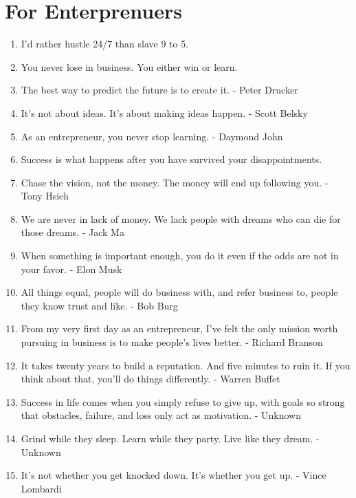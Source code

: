     \section*{For Enterprenuers}
        \begin{enumerate}
            \item I’d rather hustle 24/7 than slave 9 to 5.

            \item You never lose in business. You either win or learn.

            \item The best way to predict the future is to create it. - Peter Drucker

            \item It’s not about ideas. It’s about making ideas happen.  - Scott Belsky

            \item As an entrepreneur, you never stop learning.  - Daymond John

            \item Success is what happens after you have survived your disappointments.

            \item Chase the vision, not the money. The money will end up following you.  - Tony Hsieh

            \item We are never in lack of money. We lack people with dreams who can die for those dreams. - Jack Ma

            \item When something is important enough, you do it even if the odds are not in your favor. - Elon Musk

            \item All things equal, people will do business with, and refer business to, people they know trust and like. - Bob Burg

            \item From my very first day as an entrepreneur, I’ve felt the only mission worth pursuing in business is to make people’s lives better. - Richard Branson

            \item It takes twenty years to build a reputation. And five minutes to ruin it. If you think about that, you’ll do things differently. - Warren Buffet

            \item Success in life comes when you simply refuse to give up, with goals so strong that obstacles, failure, and loss only act as motivation. - Unknown

            \item Grind while they sleep. Learn while they party. Live like they dream. - Unknown

            \item It’s not whether you get knocked down. It’s whether you get up. - Vince Lombardi
        \end{enumerate}

